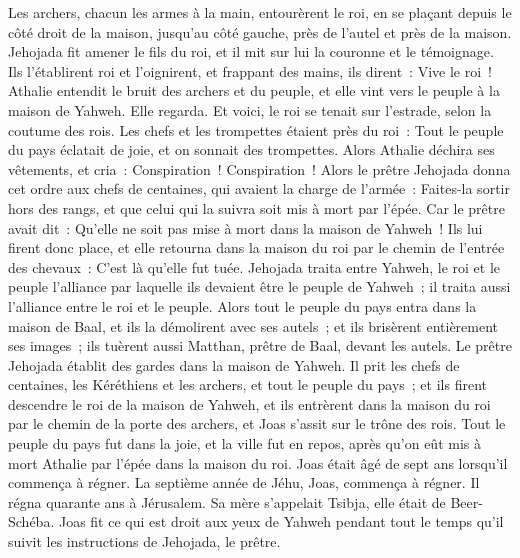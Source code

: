 \begin{multicols}{2}
Les archers, chacun les armes à la main, entourèrent le roi, en se plaçant depuis le côté droit de la maison, jusqu'au côté gauche, près de l'autel et près de la maison.
Jehojada fit amener le fils du roi, et il mit sur lui la couronne et le témoignage. Ils l'établirent roi et l'oignirent, et frappant des mains, ils dirent~: Vive le roi~!
Athalie entendit le bruit des archers et du peuple, et elle vint vers le peuple à la maison de Yahweh.
Elle regarda. Et voici, le roi se tenait sur l'estrade, selon la coutume des rois. Les chefs et les trompettes étaient près du roi~: Tout le peuple du pays éclatait de joie, et on sonnait des trompettes. Alors Athalie déchira ses vêtements, et cria~: Conspiration~! Conspiration~!
Alors le prêtre Jehojada donna cet ordre aux chefs de centaines, qui avaient la charge de l'armée~: Faites-la sortir hors des rangs, et que celui qui la suivra soit mis à mort par l'épée. Car le prêtre avait dit~: Qu'elle ne soit pas mise à mort dans la maison de Yahweh~!
Ils lui firent donc place, et elle retourna dans la maison du roi par le chemin de l'entrée des chevaux~: C'est là qu'elle fut tuée.
Jehojada traita entre Yahweh, le roi et le peuple l'alliance par laquelle ils devaient être le peuple de Yahweh~; il traita aussi l'alliance entre le roi et le peuple.
Alors tout le peuple du pays entra dans la maison de Baal, et ils la démolirent avec ses autels~; et ils brisèrent entièrement ses images~; ils tuèrent aussi Matthan, prêtre de Baal, devant les autels. Le prêtre Jehojada établit des gardes dans la maison de Yahweh.
Il prit les chefs de centaines, les Kéréthiens et les archers, et tout le peuple du pays~; et ils firent descendre le roi de la maison de Yahweh, et ils entrèrent dans la maison du roi par le chemin de la porte des archers, et Joas s'assit sur le trône des rois.
Tout le peuple du pays fut dans la joie, et la ville fut en repos, après qu'on eût mis à mort Athalie par l'épée dans la maison du roi.
Joas était âgé de sept ans lorsqu'il commença à régner.
\VerseOne{}La septième année de Jéhu, Joas, commença à régner. Il régna quarante ans à Jérusalem. Sa mère s'appelait Tsibja, elle était de Beer-Schéba.
Joas fit ce qui est droit aux yeux de Yahweh pendant tout le temps qu'il suivit les instructions de Jehojada, le prêtre.

\end{multicols}
